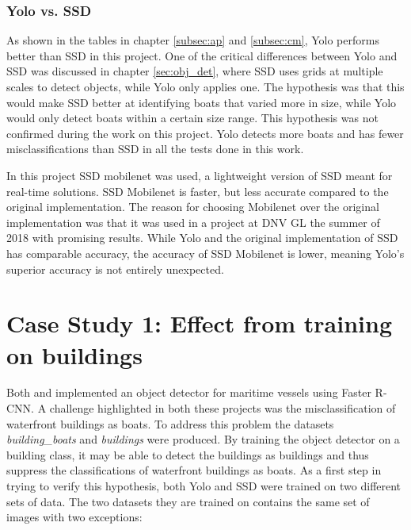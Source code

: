 \subsubsection{Yolo vs. SSD}
As shown in the tables in chapter \ref{subsec:ap} and \ref{subsec:cm}, Yolo performs better than SSD in this project. One of the critical differences between Yolo and SSD was discussed in chapter \ref{sec:obj_det}, where SSD uses grids at multiple scales to detect objects, while Yolo only applies one. The hypothesis was that this would make SSD better at identifying boats that varied more in size, while Yolo would only detect boats within a certain size range. This hypothesis was not confirmed during the work on this project. Yolo detects more boats and has fewer misclassifications than SSD in all the tests done in this work.

\vspace{3mm}

In this project SSD mobilenet was used, a lightweight version of SSD meant for real-time solutions. SSD Mobilenet is faster, but less accurate compared to the original implementation. The reason for choosing Mobilenet over the original implementation was that it was used in a project at DNV GL the summer of 2018 with promising results. While Yolo and the original implementation of SSD has comparable accuracy, the accuracy of SSD Mobilenet is lower, meaning Yolo's superior accuracy is not entirely unexpected. 








\newpage

\section{Case Study 1: Effect from training on buildings}
\label{case_study:eff_build}

Both \citep{Tangstad2017} and \citep{Kamsvag2018} implemented an object detector for maritime vessels using Faster R-CNN. A challenge highlighted in both these projects was the misclassification of waterfront buildings as boats. To address this problem the datasets \textit{building\_boats} and \textit{buildings} were produced. By training the object detector on a building class, it may be able to detect the buildings as buildings and thus suppress the classifications of waterfront buildings as boats. As a first step in trying to verify this hypothesis, both Yolo and SSD were trained on two different sets of data. The two datasets they are trained on contains the same set of images with two exceptions:

